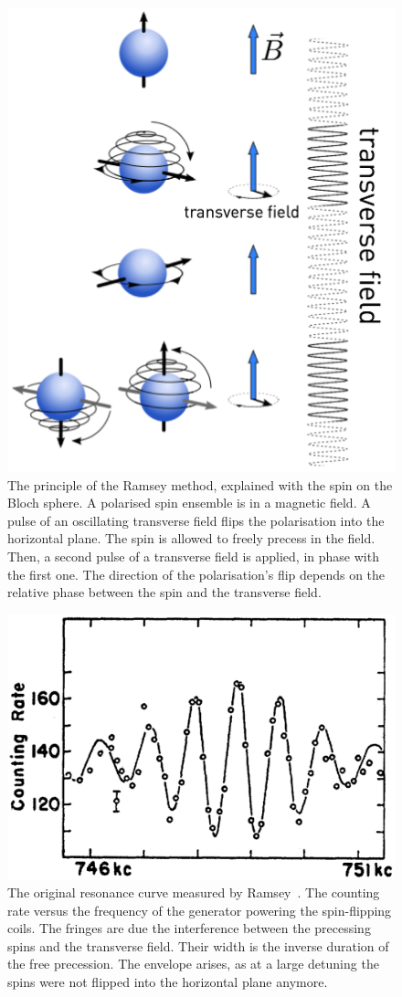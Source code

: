 \begin{figure}
  \centering
  \includegraphics[width=.6\linewidth]{gfx/nEDMatPSI/Ramsey_principle.png}
  \caption{The principle of the Ramsey method, explained with the spin on the Bloch sphere. A polarised spin ensemble is in a magnetic field. A pulse of an oscillating transverse field flips the polarisation into the horizontal plane. The spin is allowed to freely precess in the field. Then, a second pulse of a transverse field is applied, in phase with the first one. The direction of the polarisation's flip depends on the relative phase between the spin and the transverse field.}
  \label{fig:nEDM_Ramsey_principle}
\end{figure}

\begin{figure}
  \centering
  \includegraphics[width=.6\linewidth]{gfx/introduction/Ramsey_original_resonance.png}
  \caption{The original resonance curve measured by Ramsey~\cite{PhysRev.108.120}. The counting rate versus the frequency of the generator powering the spin-flipping coils. The fringes are due the interference between the precessing spins and the transverse field. Their width is the inverse duration of the free precession. The envelope arises, as at a large detuning the spins were not flipped into the horizontal plane anymore.}
  \label{fig:nEDM_Ramsey_original_curve}
\end{figure}

